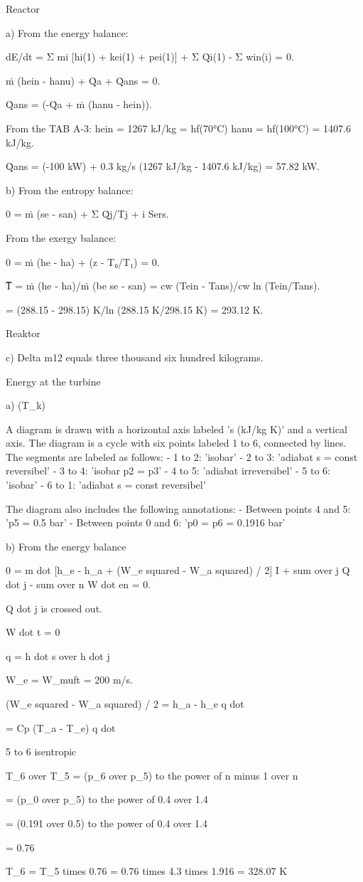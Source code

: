 Reactor

a) From the energy balance:

dE/dt = Σ mi [hi(1) + kei(1) + pei(1)] + Σ Q̇i(1) - Σ win(i) = 0.

ṁ (hein - hanu) + Q̇a + Q̇ans = 0.

Q̇ans = (-Q̇a + ṁ (hanu - hein)).

From the TAB A-3:
hein = 1267 kJ/kg = hf(70°C)
hanu = hf(100°C) = 1407.6 kJ/kg.

Q̇ans = (-100 kW) + 0.3 kg/s (1267 kJ/kg - 1407.6 kJ/kg) = 57.82 kW.

b) From the entropy balance:

0 = ṁ (se - san) + Σ Q̇j/Tj + i Sers.

From the exergy balance:

0 = ṁ (he - ha) + (z - T₀/T₁) = 0.

T̅ = ṁ (he - ha)/ṁ (be se - san) = cw (Tein - Tans)/cw ln (Tein/Tans).

= (288.15 - 298.15) K/ln (288.15 K/298.15 K) = 293.12 K.

Reaktor

c) Delta m12 equals three thousand six hundred kilograms.

Energy at the turbine

a) (T_k)

A diagram is drawn with a horizontal axis labeled 's (kJ/kg K)' and a vertical axis. The diagram is a cycle with six points labeled 1 to 6, connected by lines. The segments are labeled as follows:
- 1 to 2: 'isobar'
- 2 to 3: 'adiabat s = const reversibel'
- 3 to 4: 'isobar p2 = p3'
- 4 to 5: 'adiabat irreversibel'
- 5 to 6: 'isobar'
- 6 to 1: 'adiabat s = const reversibel'

The diagram also includes the following annotations:
- Between points 4 and 5: 'p5 = 0.5 bar'
- Between points 0 and 6: 'p0 = p6 = 0.1916 bar'

b) From the energy balance

0 = m dot [h_e - h_a + (W_e squared - W_a squared) / 2] I + sum over j Q dot j - sum over n W dot en = 0.

Q dot j is crossed out.

W dot t = 0

q = h dot s over h dot j

W_e = W_muft = 200 m/s.

(W_e squared - W_a squared) / 2 = h_a - h_e q dot

= Cp (T_a - T_e) q dot

5 to 6 isentropic

T_6 over T_5 = (p_6 over p_5) to the power of n minus 1 over n

= (p_0 over p_5) to the power of 0.4 over 1.4

= (0.191 over 0.5) to the power of 0.4 over 1.4

= 0.76

T_6 = T_5 times 0.76 = 0.76 times 4.3 times 1.916 = 328.07 K